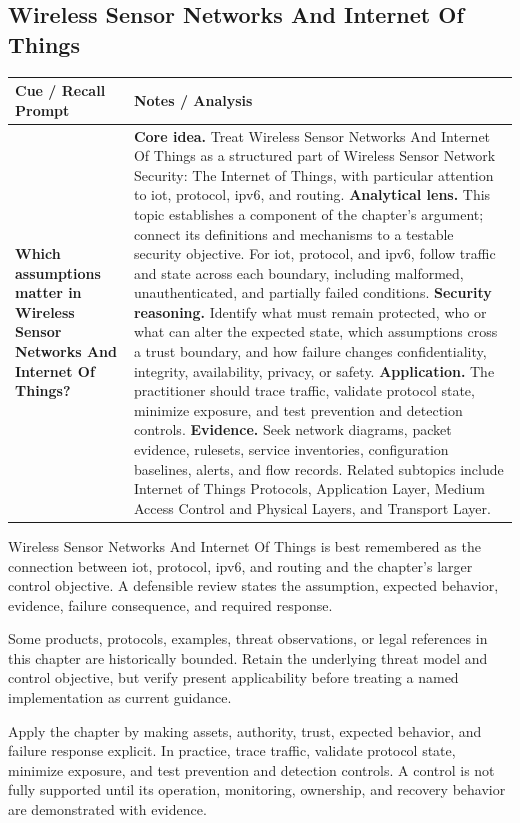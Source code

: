 \documentclass[11pt]{article}
\newcommand{\CornellHeader}{%
\rowcolor{Navy}\color{white}\bfseries Cue / Recall Prompt & \color{white}\bfseries Notes / Analysis\\\hline}
\newcommand{\CornellRow}[2]{%
\cellcolor{CueGray}\RaggedRight\textbf{#1} & \RaggedRight #2\\\hline}
\begin{document}
\subsection*{Wireless Sensor Networks And Internet Of Things}
\begin{longtable}{>{\RaggedRight\arraybackslash}p{}|>{\RaggedRight\arraybackslash}p{}}
\CornellHeader
\CornellRow{Which assumptions matter in Wireless Sensor Networks And Internet Of Things?}{\textbf{Core idea.} Treat Wireless Sensor Networks And Internet Of Things as a structured part of Wireless Sensor Network Security: The Internet of Things, with particular attention to iot, protocol, ipv6, and routing. \textbf{Analytical lens.} This topic establishes a component of the chapter's argument; connect its definitions and mechanisms to a testable security objective. For iot, protocol, and ipv6, follow traffic and state across each boundary, including malformed, unauthenticated, and partially failed conditions. \textbf{Security reasoning.} Identify what must remain protected, who or what can alter the expected state, which assumptions cross a trust boundary, and how failure changes confidentiality, integrity, availability, privacy, or safety. \textbf{Application.} The practitioner should trace traffic, validate protocol state, minimize exposure, and test prevention and detection controls. \textbf{Evidence.} Seek network diagrams, packet evidence, rulesets, service inventories, configuration baselines, alerts, and flow records. Related subtopics include Internet of Things Protocols, Application Layer, Medium Access Control and Physical Layers, and Transport Layer.}
\end{longtable}
\begin{topicsummary}
Wireless Sensor Networks And Internet Of Things is best remembered as the connection between iot, protocol, ipv6, and routing and the chapter's larger control objective. A defensible review states the assumption, expected behavior, evidence, failure consequence, and required response.
\end{topicsummary}
\begin{historybox}
Some products, protocols, examples, threat observations, or legal references in this chapter are historically bounded. Retain the underlying threat model and control objective, but verify present applicability before treating a named implementation as current guidance.
\end{historybox}
\begin{defensebox}
Apply the chapter by making assets, authority, trust, expected behavior, and failure response explicit. In practice, trace traffic, validate protocol state, minimize exposure, and test prevention and detection controls. A control is not fully supported until its operation, monitoring, ownership, and recovery behavior are demonstrated with evidence.
\end{defensebox}
\end{document}
